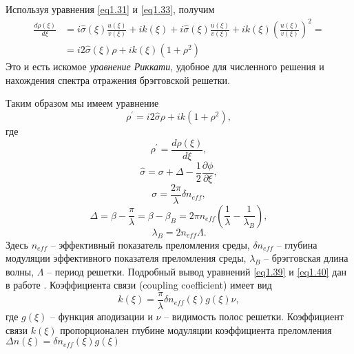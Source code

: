 Используя уравнения \eqref{eq1.31} и \eqref{eq1.33}, получим
\begin{equation}\label{eq1.35}
\begin{split}
    \frac{d\rho(\xi)}{d\xi}&=i\hat{\sigma}(\xi)\frac{u(\xi)}{v(\xi)}+ik(\xi)+i\hat{\sigma}(\xi)\frac{u(\xi)}{v(\xi)}+ik(\xi)\left(\frac{u(\xi)}{v(\xi)}\right)^2=\\
    &=i2\hat{\sigma}(\xi)\rho+ik(\xi)(1+\rho^2)
\end{split}
\end{equation}
Это и есть искомое \textit{уравнение Риккати}, удобное для численного решения и нахождения спектра отражения брэгговской решетки.

Таким образом мы имеем уравнение
\begin{equation}\label{eq1.36}
    \rho^{\prime}=i2\hat{\sigma}\rho+ik(1+\rho^2),
\end{equation}
где
\begin{equation}\label{eq1.37}
    \rho^{\prime}=\frac{d\rho(\xi)}{d\xi},
\end{equation}
\begin{equation}\label{eq1.38}
    \hat{\sigma}=\sigma+\Delta-\frac{1}{2}\frac{\partial\phi}{\partial\xi},
\end{equation}
\begin{equation}\label{eq1.39}
    \sigma=\frac{2\pi}{\lambda}\delta n_{eff},
\end{equation}
\begin{equation}\label{eq1.40}
    \Delta=\beta-\frac{\pi}{\lambda}=\beta-\beta_B=2\pi n_{eff}\left(\frac{1}{\lambda}-\frac{1}{\lambda_B}\right),
\end{equation}
\begin{equation}\label{eq1.41}
    \lambda_B=2n_{eff}\Lambda.
\end{equation}
Здесь $n_{eff}$ -- эффективный показатель преломления среды, $\delta n_{eff}$ -- глубина модуляции эффективного показателя преломления среды, $\lambda_B$ -- брэгговская длина волны, $\Lambda$ -- период решетки. Подробный вывод уравнений \eqref{eq1.39} и \eqref{eq1.40} дан в работе \cite{skaar_phd}.
Коэффициента связи (coupling coefficient) имеет вид
\begin{equation}\label{eq1.42}
    k(\xi)=\frac{\pi}{\lambda}\delta n_{eff}(\xi)g(\xi)\nu,
\end{equation}
где $g(\xi)$ -- функция аподизации и $\nu$ -- видимость полос решетки. Коэффициент связи $k(\xi)$ пропорционален глубине модуляции коэффициента преломления $\Delta n(\xi)=\delta n_{eff}(\xi)g(\xi)$

